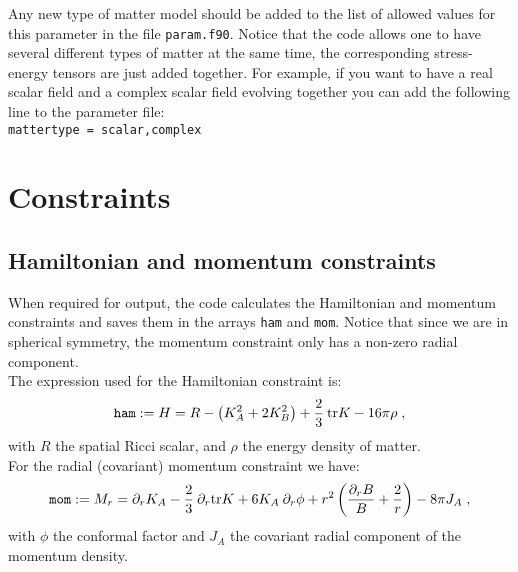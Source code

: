 \documentclass[12pt]{article}
\begin{document}
Any new type of matter model should be added to the list of allowed
values for this parameter in the file \texttt{param.f90}. Notice that
the code allows one to have several different types of matter at the
same time, the corresponding stress-energy tensors are just added
together. For example, if you want to have a real scalar field and a
complex scalar field evolving together you can add the following line
to the parameter file: \\

\texttt{mattertype = scalar,complex} \\

\vspace{3mm}



\setcounter{equation}{0}
\section{Constraints}
\label{sec:constraints}

\subsection{Hamiltonian and momentum constraints}

When required for output, the code calculates the Hamiltonian and
momentum constraints and saves them in the arrays \texttt{ham} and
\texttt{mom}.  Notice that since we are in spherical symmetry, the
momentum constraint only has a non-zero radial component. \\

The expression used for the Hamiltonian constraint is:
\begin{equation}
\texttt{ham} := H = R - \left( K_A^2 + 2 K_B^2 \right) + \frac{2}{3} \: {\rm tr} K
- 16 \pi \rho \;,
\end{equation}
with $R$ the spatial Ricci scalar, and $\rho$ the energy density of
matter. \\

For the radial (covariant) momentum constraint we have:
\begin{equation}
\texttt{mom} := M_r = \partial_r K_A - \frac{2}{3} \: \partial_r {\rm tr} K
+ 6 K_A \: \partial_r \phi + r^2 \left( \frac{\partial_r B}{B} + \frac{2}{r} \right)
- 8 \pi J_A \; ,
\end{equation}
with $\phi$ the conformal factor and $J_A$ the covariant radial
component of the momentum density. \\
\end{document}
